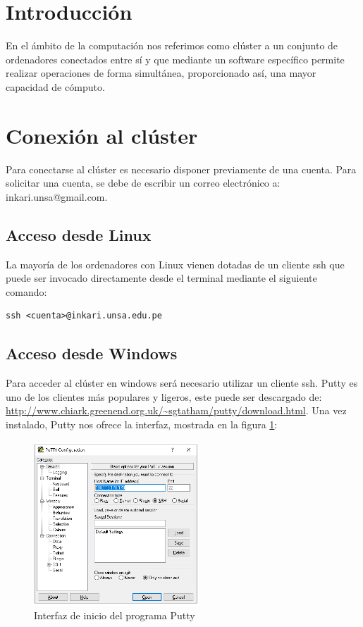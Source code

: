 \documentclass[a4paper,11pt]{article}
\begin{document}

\section{Introducción}

En el ámbito de la computación nos referimos como clúster a un conjunto de ordenadores conectados entre sí y que mediante un software específico permite realizar operaciones de forma simultánea, proporcionado así, una mayor capacidad de cómputo.

\section{Conexión al clúster}

Para conectarse al clúster es necesario disponer previamente de una cuenta. Para solicitar una cuenta, se debe de escribir un correo electrónico a: inkari.unsa@gmail.com.

\subsection{Acceso desde Linux}

La mayoría de los ordenadores con Linux vienen dotadas de un cliente ssh que puede ser invocado directamente desde el terminal mediante el siguiente comando:

\begin{lstlisting}
ssh <cuenta>@inkari.unsa.edu.pe
\end{lstlisting}

\subsection{Acceso desde Windows}

Para acceder al clúster en windows será necesario utilizar un cliente ssh. Putty es uno de los clientes más populares y ligeros, este puede ser descargado de: \url{http://www.chiark.greenend.org.uk/~sgtatham/putty/download.html}.
Una vez instalado, Putty nos ofrece la interfaz, mostrada en la figura \ref{fig:putty_1}:

\begin{figure}[!ht]
    \centering
    \includegraphics[width=6.2cm]{putty_1}
    \caption{Interfaz de inicio del programa Putty}
    \label{fig:putty_1}
\end{figure}
\end{document}
